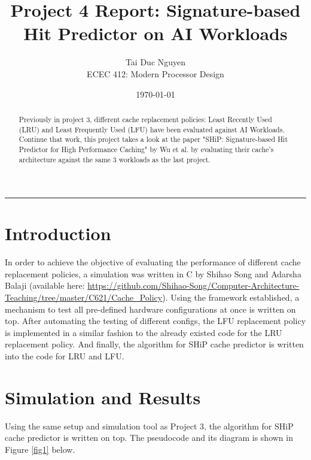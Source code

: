 \documentclass[letterpaper, 11pt]{article}
\title{Project 4 Report: Signature-based Hit Predictor on AI Workloads}
\author{
Tai Duc Nguyen \\
ECEC 412: Modern Processor Design
}
\date{\today}
\begin{document}
\maketitle
\rule{\textwidth}{1pt}

\begin{abstract}
	Previously in project 3, different cache replacement policies: Least Recently Used (LRU) and Least Frequently Used (LFU) have been evaluated against AI Workloads. Continue that work, this project takes a look at the paper "SHiP: Signature-based Hit Predictor for High Performance Caching" by Wu et al. by evaluating their cache's architecture against the same 3 workloads as the last project.
\end{abstract}

\section{Introduction}
\label{intro}
	In order to achieve the objective of evaluating the performance of different cache replacement policies, a simulation was written in C by Shihao Song and Adarsha Balaji (available here: \url{https://github.com/Shihao-Song/Computer-Architecture-Teaching/tree/master/C621/Cache_Policy}). Using the framework established, a mechanism to test all pre-defined hardware configurations at once is written on top. After automating the testing of different configs, the LFU replacement policy is implemented in a similar fashion to the already existed code for the LRU replacement policy. And finally, the algorithm for SHiP cache predictor is written into the code for LRU and LFU.

\section{Simulation and Results}
	Using the same setup and simulation tool as Project 3, the algorithm for SHiP cache predictor is written on top. The pseudocode and its diagram is shown in Figure \ref{fig1} below.
\end{document}
